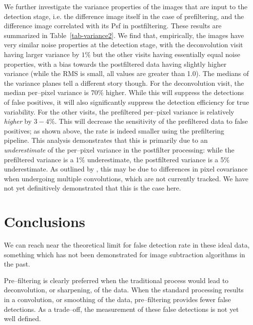 \documentclass[prd, nofootinbib, floatfix, 11pt,tightenlines,times]{article}
\begin{document}
We further investigate the variance properties of the images that are
input to the detection stage, i.e. the difference image itself in the
case of prefiltering, and the difference image correlated with its Psf
in postfiltering.  These results are summarized in
Table~\ref{tab-variance2}.  We find that, empirically, the images have
very similar noise properties at the detection stage, with the
deconvolution visit having larger variance by $1\%$ but the other
visits having essentially equal noise properties, with a bias towards
the postfiltered data having slightly higher variance (while the RMS
is small, all values are greater than 1.0).  The medians of the
variance planes tell a different story though.  For the deconvolution
visit, the median per--pixel variance is $70\%$ higher.  While this
will suppress the detections of false positives, it will also
significantly suppress the detection efficiency for true variability.
For the other visits, the prefiltered per--pixel variance is
relatively {\it higher} by $3-4\%$.  This will decrease the
sensitivity of the prefiltered data to false positives; as shown
above, the rate is indeed smaller using the prefiltering pipeline.
This analysis demonstrates that this is primarily due to an {\it
  underestimate} of the per--pixel variance in the postfilter
processing: while the prefiltered variance is a 1\% underestimate, the
postfiltered variance is a 5\% underestimate.  As outlined by
\cite{Price-Stacking}, this may be due to differences in pixel
covariance when undergoing multiple convolutions, which are not
currently tracked.  We have not yet definitively demonstrated that
this is the case here.

\section{Conclusions}

We can reach near the theoretical limit for false detection rate in
these ideal data, something which has not been demonstrated for image
subtraction algorithms in the past.

Pre--filtering is clearly preferred when the traditional process would
lead to deconvolution, or sharpening, of the data.  When the standard
processing results in a convolution, or smoothing of the data,
pre--filtering provides fewer false detections.  As a trade--off, the
measurement of these false detections is not yet well defined.
\end{document}
